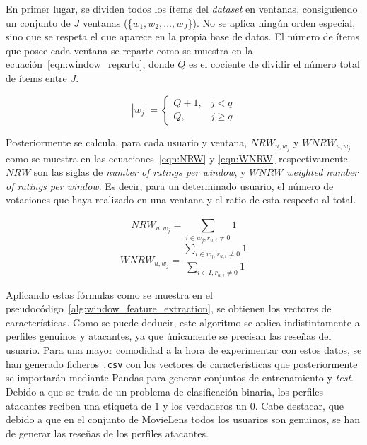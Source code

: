 En primer lugar, se dividen todos los ítems del \textit{dataset} en ventanas, consiguiendo un conjunto de $J$ ventanas (\{$w_1, w_2, ..., w_J$\}). No se aplica ningún orden especial, sino que se respeta el que aparece en la propia base de datos. El número de ítems que posee cada ventana se reparte como se muestra en la ecuación~\ref{eqn:window_reparto}, donde $Q$ es el cociente de dividir el número total de ítems entre $J$.

\[|w_j| = \left\{ \begin{array}{lr} Q + 1, & j < q\\ Q, & j \ge q \label{eqn:window_reparto} \end{array} \right. \] 

Posteriormente se calcula, para cada usuario y ventana, $NRW_{u, w_j}$ y  $WNRW_{u, w_j}$ como se muestra en las ecuaciones~\ref{eqn:NRW} y \ref{eqn:WNRW} respectivamente. $NRW$ son las siglas de \textit{number of ratings per window}, y $WNRW$ \textit{weighted number of ratings per window}. Es decir, para un determinado usuario, el número de votaciones que haya realizado en una ventana y el ratio de esta respecto al total.

\begin{equation}\label{eqn:NRW} NRW_{u, w_j} = \sum_{i\in w_j, r_{u,i} \ne 0}^{} 1 \end{equation}
\begin{equation}\label{eqn:WNRW} WNRW_{u, w_j} = \frac{\sum_{i\in w_j, r_{u,i} \ne 0}^{} 1}{\sum_{i\in I, r_{u,i} \ne 0}^{} 1} \end{equation}

Aplicando estas fórmulas como se muestra en el pseudocódigo~\ref{alg:window_feature_extraction}, se obtienen los vectores de características. Como se puede deducir, este algoritmo se aplica indistintamente a perfiles genuinos y atacantes, ya que únicamente se precisan las reseñas del usuario. Para una mayor comodidad a la hora de experimentar con estos datos, se han generado ficheros \texttt{.csv} con los vectores de características que posteriormente se importarán mediante Pandas para generar conjuntos de entrenamiento y \textit{test}. Debido a que se trata de un problema de clasificación binaria, los perfiles atacantes reciben una etiqueta de $1$ y los verdaderos un $0$. Cabe destacar, que debido a que en el conjunto de MovieLens todos los usuarios son genuinos, se han de generar las reseñas de los perfiles atacantes. 

